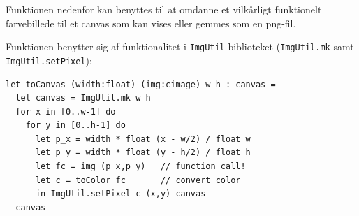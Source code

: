 \documentclass[rgb]{beamer}
\begin{document}
\begin{frame}[fragile]
\begin{footnotesize}


  Funktionen nedenfor kan benyttes til at omdanne et vilkårligt
  funktionelt farvebillede til et canvas som kan vises eller gemmes
  som en png-fil.

  \vspace{1ex}

  Funktionen benytter sig af funktionalitet i \lstinline{ImgUtil}
  biblioteket (\lstinline{ImgUtil.mk} samt \lstinline{ImgUtil.setPixel}):

  \vspace{1ex}

\begin{lstlisting}[numbers=none,frame=none,mathescape]
let toCanvas (width:float) (img:cimage) w h : canvas =
  let canvas = ImgUtil.mk w h
  for x in [0..w-1] do
    for y in [0..h-1] do
      let p_x = width * float (x - w/2) / float w
      let p_y = width * float (y - h/2) / float h
      let fc = img (p_x,p_y)   // function call!
      let c = toColor fc       // convert color
      in ImgUtil.setPixel c (x,y) canvas
  canvas
\end{lstlisting}

\end{footnotesize}
\end{frame}
\end{document}
